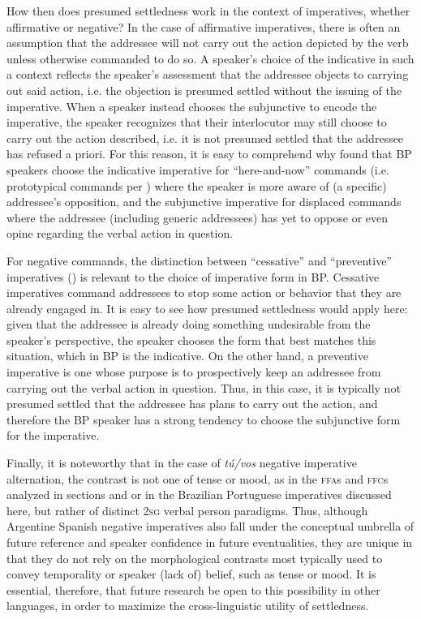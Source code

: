 \documentclass[output=paper,colorlinks,citecolor=brown]{langscibook}
\begin{document}
How then does presumed settledness work in the context of imperatives, whether affirmative or negative? In the case of affirmative imperatives, there is often an assumption that the addressee will not carry out the action depicted by the verb unless otherwise commanded to do so. A speaker’s choice of the indicative in such a context reflects the speaker’s assessment that the addressee objects to carrying out said action, i.e. the objection is presumed settled without the issuing of the imperative. When a speaker instead chooses the subjunctive to encode the imperative, the speaker recognizes that their interlocutor may still choose to carry out the action described, i.e. it is not presumed settled that the addressee has refused a priori. For this reason, it is easy to comprehend why \citet{LambertiSchwenter2018} found that BP speakers choose the indicative imperative for ``here-and-now'' commands (i.e. prototypical commands per \citealt{Aikhenvald2010}) where the speaker is more aware of (a specific) addressee’s opposition, and the subjunctive imperative for displaced commands where the addressee (including generic addressees) has yet to oppose or even opine regarding the verbal action in question.

For negative commands, the distinction between ``cessative'' and ``preventive'' imperatives (\citealt{Haverkate1979}) is relevant to the choice of imperative form in BP. Cessative imperatives command addressees to stop some action or behavior that they are already engaged in. It is easy to see how presumed settledness would apply here: given that the addressee is already doing something undesirable from the speaker’s perspective, the speaker chooses the form that best matches this situation, which in BP is the indicative. On the other hand, a preventive imperative is one whose purpose is to prospectively keep an addressee from carrying out the verbal action in question. Thus, in this case, it is typically not presumed settled that the addressee has plans to carry out the action, and therefore the BP speaker has a strong tendency to choose the subjunctive form for the imperative.

Finally, it is noteworthy that in the case of \textit{tú/vos} negative imperative alternation, the contrast is not one of tense or mood, as in the \textsc{ffa}s and \textsc{ffc}s analyzed in sections  and  or in the Brazilian Portuguese imperatives discussed here, but rather of distinct \textsc{2sg} verbal person paradigms. Thus, although Argentine Spanish negative imperatives also fall under the conceptual umbrella of future reference and speaker confidence in future eventualities, they are unique in that they do not rely on the morphological contrasts most typically used to convey temporality or speaker (lack of) belief, such as tense or mood. It is essential, therefore, that future research be open to this possibility in other languages, in order to maximize the cross-linguistic utility of settledness.
\end{document}
